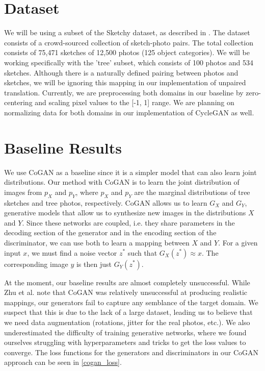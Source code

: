 \documentclass[10pt,twocolumn,letterpaper]{article}
\begin{document}
\section{Dataset}
We will be using a subset of the Sketchy dataset, as described in \cite{sangkloy2016sketchy}. The dataset consists of a crowd-sourced collection of sketch-photo pairs. The total collection consists of 75,471 sketches of 12,500 photos (125 object categories). We will be working specifically with the 'tree' subset, which consists of 100 photos and 534 sketches. Although there is a naturally defined pairing between photos and sketches, we will be ignoring this mapping in our implementation of unpaired translation. Currently, we are preprocessing both domains in our baseline by zero-centering and scaling pixel values to the [-1, 1] range. We are planning on normalizing data for both domains in our implementation of CycleGAN as well.

\section{Baseline Results}
We use CoGAN \cite{cogan} as a baseline since it is a simpler model that can also learn joint distributions.
Our method with CoGAN is to learn the joint distribution of images from $p_X$ and $p_Y$, where $p_X$ and $p_Y$ are the marginal distributions of tree sketches and tree photos, respectively.
CoGAN allows us to learn $G_X$ and $G_Y$, generative models that allow us to synthesize new images in the distributions $X$ and $Y$.
Since these networks are coupled, i.e. they share parameters in the decoding section of the generator and in the encoding section of the discriminator, we can use both to learn a mapping between $X$ and $Y$.
For a given input $x$, we must find a noise vector $z^*$ such that $G_X(z^*) \approx x$.
The corresponding image $y$ is then just $G_Y(z^*)$.

At the moment, our baseline results are almost completely unsuccessful.
While Zhu et al. \cite{cycleGAN} note that CoGAN was relatively unsuccessful at producing realistic mappings, our generators fail to capture any semblance of the target domain.
We suspect that this is due to the lack of a large dataset, leading us to believe that we need data augmentation (rotations, jitter for the real photos, etc.).
We also underestimated the difficulty of training generative networks, where we found ourselves struggling with hyperparameters and tricks to get the loss values to converge.
The loss functions for the generators and discriminators in our CoGAN approach can be seen in \ref{cogan_loss}.
\end{document}
